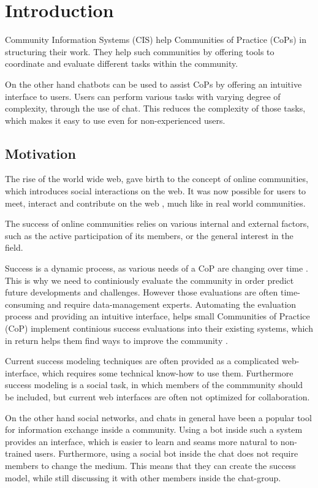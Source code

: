 \chapter{Introduction}
Community Information Systems (CIS) help Communities of Practice (CoPs) in structuring their work. They help such communities by offering tools to coordinate and evaluate different tasks within the community.

On the other hand chatbots can be used to assist CoPs by offering an intuitive interface to users. Users can perform various tasks with varying degree of complexity, through the use of chat. This reduces the complexity of those tasks, which makes it easy to use even for non-experienced users.

\section{Motivation}
The rise of the world wide web, gave birth to the concept of online communities, which introduces social interactions on the web. It was now possible for users to meet, interact and contribute on the web \cite{Renz08}, much like in real world communities.

The success of online communities relies on various internal and external factors, such as the active participation of its members, or the general interest in the field.

Success is a dynamic process, as various needs of a CoP are changing over time \cite{Renz08,GKJa08}. This is why we need to continiously evaluate the community in order predict future developments and challenges. However those evaluations are often time-consuming and require data-management experts. Automating the evaluation process and providing an intuitive interface, helps small Communities of Practice (CoP) implement continious success evaluations into their existing systems, which in return helps them find ways to improve the community \cite{Renz08}.

Current success modeling techniques are often provided as a complicated web-interface, which requires some technical know-how to use them. Furthermore success modeling is a social task, in which members of the commmunity should be included, but current web interfaces are often not optimized for collaboration.

On the other hand social networks, and chats in general have been a popular tool for information exchange inside a community. Using a bot inside such a system provides an interface, which is easier to learn and seams more natural to non-trained users. Furthermore, using a social bot inside the chat does not require members to change the medium. This means that they can create the success model, while still discussing it with other members inside the chat-group.

